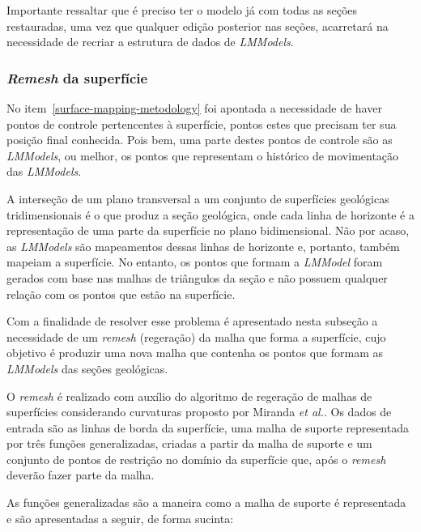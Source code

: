 Importante ressaltar que é preciso ter o modelo já com todas as seções restauradas, uma vez que qualquer edição posterior nas seções, acarretará na necessidade de recriar a estrutura de dados de \textit{LMModels}.

\subsubsection{\textit{Remesh} da superfície}

No item~\ref{surface-mapping-metodology} foi apontada a necessidade de haver pontos de controle pertencentes à superfície, pontos estes que precisam ter sua posição final conhecida. Pois bem, uma parte destes pontos de controle são as \textit{LMModels}, ou melhor, os pontos que representam o histórico de movimentação das \textit{LMModels}.

A interseção de um plano transversal a um conjunto de superfícies geológicas tridimensionais é o que produz a seção geológica, onde cada linha de horizonte é a representação de uma parte da superfície no plano bidimensional. Não por acaso, as \textit{LMModels} são mapeamentos dessas linhas de horizonte e, portanto, também mapeiam a superfície. No entanto, os pontos que formam a \textit{LMModel} foram gerados com base nas malhas de triângulos da seção e não possuem qualquer relação com os pontos que estão na superfície.

Com a finalidade de resolver esse problema é apresentado nesta subseção a necessidade de um \textit{remesh} (regeração) da malha que forma a superfície, cujo objetivo é produzir uma nova malha que contenha os pontos que formam as \textit{LMModels} das seções geológicas.

O \textit{remesh} é realizado com auxílio do algoritmo de regeração de malhas de superfícies considerando curvaturas proposto por Miranda \textit{et al.}\cite{Miranda}. Os dados de entrada são as linhas de borda da superfície, uma malha de suporte representada por três funções generalizadas, criadas a partir da malha de suporte e um conjunto de pontos de restrição no domínio da superfície que, após o \textit{remesh} deverão fazer parte da malha.

As funções generalizadas são a maneira como a malha de suporte é representada e são apresentadas a seguir, de forma sucinta:

